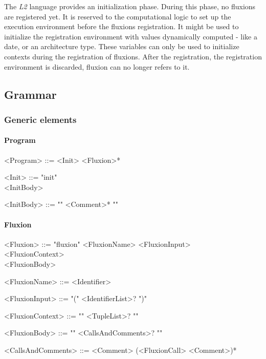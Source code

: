The \textit{L2} language provides an initialization phase.
During this phase, no fluxions are registered yet.
It is reserved to the computational logic to set up the execution environment before the fluxions registration.
It might be used to initialize the registration environment with values  dynamically computed - like a date, or an architecture type.
These variables can only be used to initialize contexts during the registration of fluxions.
After the registration, the registration environment is discarded, fluxion can no longer refers to it.

\subsection{Grammar} \label{section:grammar}

\subsubsection{Generic elements}


\setlength{\grammarindent}{12em} %

\paragraph{Program}

\begin{grammar}
<Program>             ::= <Init> <Fluxion>*

<Init>                ::= "init"\\
                          <InitBody>

<InitBody>            ::= "{" <Comment>* "}"
\end{grammar}

\paragraph{Fluxion}

\begin{grammar}
<Fluxion>             ::= "fluxion" <FluxionName>
                          <FluxionInput>\\
                          <FluxionContext>\\
                          <FluxionBody>

<FluxionName>         ::= <Identifier>

<FluxionInput>        ::= "(" <IdentifierList>? ")"

<FluxionContext>      ::= "{" <TupleList>? "}"

<FluxionBody>         ::= "{" <CallsAndComments>? "}"

<CallsAndComments>    ::= <Comment> (<FluxionCall> <Comment>)*

\end{grammar}

